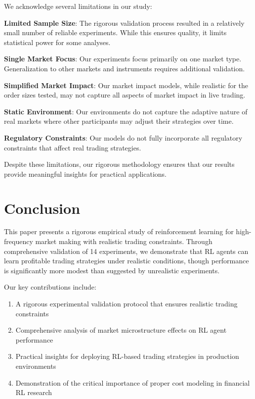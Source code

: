 \documentclass[11pt,a4paper]{article}
\begin{document}
We acknowledge several limitations in our study:

\textbf{Limited Sample Size}: The rigorous validation process resulted in a relatively small number of reliable experiments. While this ensures quality, it limits statistical power for some analyses.

\textbf{Single Market Focus}: Our experiments focus primarily on one market type. Generalization to other markets and instruments requires additional validation.

\textbf{Simplified Market Impact}: Our market impact models, while realistic for the order sizes tested, may not capture all aspects of market impact in live trading.

\textbf{Static Environment}: Our environments do not capture the adaptive nature of real markets where other participants may adjust their strategies over time.

\textbf{Regulatory Constraints}: Our models do not fully incorporate all regulatory constraints that affect real trading strategies.

Despite these limitations, our rigorous methodology ensures that our results provide meaningful insights for practical applications.
\
\

\section{Conclusion}
\label{sec:conclusion}

This paper presents a rigorous empirical study of reinforcement learning for high-frequency market making with realistic trading constraints. Through comprehensive validation of 14 experiments, we demonstrate that RL agents can learn profitable trading strategies under realistic conditions, though performance is significantly more modest than suggested by unrealistic experiments.

Our key contributions include:

\begin{enumerate}
\item A rigorous experimental validation protocol that ensures realistic trading constraints
\item Comprehensive analysis of market microstructure effects on RL agent performance
\item Practical insights for deploying RL-based trading strategies in production environments
\item Demonstration of the critical importance of proper cost modeling in financial RL research
\end{enumerate}
\end{document}
